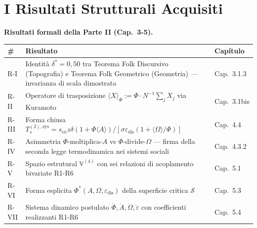 \section{I Risultati Strutturali
Acquisiti}\label{i-risultati-strutturali-acquisiti}

\Proved{} \textbf{Risultati formali della Parte II (Cap.~3-5).}

{\def\LTcaptype{none} %
{\small\begin{longtable}[]{@{}
  >{\raggedright\arraybackslash}p{}
  >{\raggedright\arraybackslash}p{}
  >{\raggedright\arraybackslash}p{}@{}}
\toprule\noalign{}
\begin{minipage}[b]{\linewidth}\raggedright
\#
\end{minipage} & \begin{minipage}[b]{\linewidth}\raggedright
Risultato
\end{minipage} & \begin{minipage}[b]{\linewidth}\raggedright
Capítulo
\end{minipage} \\
\midrule\noalign{}
\endhead
\bottomrule\noalign{}
\endlastfoot
R-I & Identità \(\delta^* = 0{,}50\) tra Teorema Folk Discursivo
(Topografia) e Teorema Folk Geometrico (Geometria) --- invarianza di
scala dimostrata & Cap.~3.1.3 \\
R-II & Operatore di trasposizione
\(\langle X \rangle_\Phi := \Phi \cdot N^{-1}\sum_j X_j\) via Kuramoto &
Cap.~3.1bis \\
R-III & Forma chiusa
\(T_s^{(2),\text{sys}} = s_{iii} z \delta (1+\Phi\langle A\rangle) / [\sigma \varepsilon_{\text{dis}} (1 + \langle\Omega\rangle/\Phi)]\)
& Cap.~4.4 \\
R-IV & Asimmetria \(\Phi\)-moltiplica-\(A\) vs
\(\Phi\)-divide-\(\Omega\) --- firma della seconda legge termodinamica
nei sistemi sociali & Cap.~4.3.2 \\
R-V & Spazio estrutural \(\mathbb{V}^{(4)}\) con sei relazioni di
acoplamento bivariate R1-R6 & Cap.~5.1 \\
R-VI & Forma esplicita \(\Phi^*(A, \Omega, \varepsilon_{\text{dis}})\)
della superficie critica \(\mathcal{S}\) & Cap.~5.3 \\
R-VII & Sistema dinamico postulato
\(\dot\Phi, \dot A, \dot\Omega, \dot\varepsilon\) con coefficienti
realizzanti R1-R6 & Cap.~5.4 \\
\end{longtable}}
}


